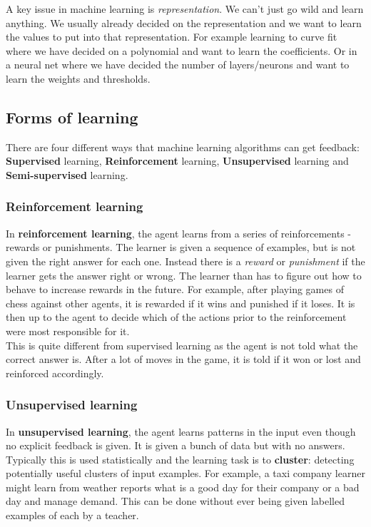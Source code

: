 \documentclass{article}
\newcommand{\n}[0]{\\[\baselineskip]}
\begin{document}
A key issue in machine learning is \textit{representation}. We can't just go wild and learn anything. We usually already decided on the representation and we want to learn the values to put into that representation. For example learning to curve fit where we have decided on a polynomial and want to learn the coefficients. Or in a neural net where we have decided the number of layers/neurons and want to learn the weights and thresholds. 
\subsection{Forms of learning}
There are four different ways that machine learning algorithms can get feedback: \textbf{Supervised} learning, \textbf{Reinforcement} learning, \textbf{Unsupervised} learning and \textbf{Semi-supervised} learning.

\subsubsection{Reinforcement learning}
In \textbf{reinforcement learning}, the agent learns from a series of reinforcements - rewards or punishments. The learner is given a sequence of examples, but is not given the right answer for each one. Instead there is a \textit{reward} or \textit{punishment} if the learner gets the answer right or wrong. The learner than has to figure out how to behave to increase rewards in the future. For example, after playing games of chess against other agents, it is rewarded if it wins and punished if it loses. It is then up to the agent to decide which of the actions prior to the reinforcement were most responsible for it. 
\n
This is quite different from supervised learning as the agent is not told what the correct answer is. After a lot of moves in the game, it is told if it won or lost and reinforced accordingly. 

\subsubsection{Unsupervised learning}
In \textbf{unsupervised learning}, the agent learns patterns in the input even though no explicit feedback is given. It is given a bunch of data but with no answers. Typically this is used statistically and the learning task is to \textbf{cluster}: detecting potentially useful clusters of input examples. For example, a taxi company learner might learn from weather reports what is a good day for their company or a bad day and manage demand. This can be done without ever being given labelled examples of each by a teacher. 
\end{document}
